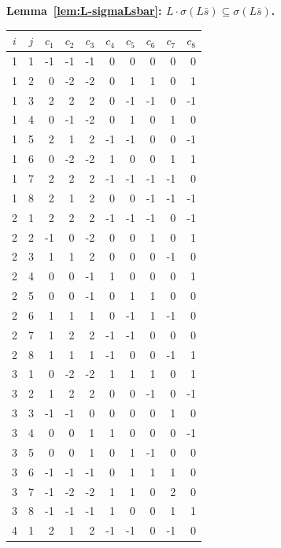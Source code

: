 \documentclass[twoside,english]{paper}
\numberwithin{equation}{section}
\numberwithin{figure}{section}
\theoremstyle{definition}
\theoremstyle{remark}
\begin{document}
\begin{table}[H]
\centering
{\bfseries Lemma~\ref{lem:L-sigmaLsbar}: $L \cdot \sigma(L\bar s) \subseteq \sigma(L\bar s)$.}\par\medskip
\footnotesize
\setlength{\tabcolsep}{4pt}
\begin{minipage}[t]{0.48\textwidth}
\centering
\begin{tabular}{cc|rrrrrrrr}
\toprule
$i$ & $j$ & $c_1$ & $c_2$ & $c_3$ & $c_4$ & $c_5$ & $c_6$ & $c_7$ & $c_8$ \\
\midrule
1 & 1 & -1 & -1 & -1 & 0 & 0 & 0 & 0 & 0 \\
1 & 2 & 0 & -2 & -2 & 0 & 1 & 1 & 0 & 1 \\
1 & 3 & 2 & 2 & 2 & 0 & -1 & -1 & 0 & -1 \\
1 & 4 & 0 & -1 & -2 & 0 & 1 & 0 & 1 & 0 \\
1 & 5 & 2 & 1 & 2 & -1 & -1 & 0 & 0 & -1 \\
1 & 6 & 0 & -2 & -2 & 1 & 0 & 0 & 1 & 1 \\
1 & 7 & 2 & 2 & 2 & -1 & -1 & -1 & -1 & 0 \\
1 & 8 & 2 & 1 & 2 & 0 & 0 & -1 & -1 & -1 \\
\midrule
2 & 1 & 2 & 2 & 2 & -1 & -1 & -1 & 0 & -1 \\
2 & 2 & -1 & 0 & -2 & 0 & 0 & 1 & 0 & 1 \\
2 & 3 & 1 & 1 & 2 & 0 & 0 & 0 & -1 & 0 \\
2 & 4 & 0 & 0 & -1 & 1 & 0 & 0 & 0 & 1 \\
2 & 5 & 0 & 0 & -1 & 0 & 1 & 1 & 0 & 0 \\
2 & 6 & 1 & 1 & 1 & 0 & -1 & 1 & -1 & 0 \\
2 & 7 & 1 & 2 & 2 & -1 & -1 & 0 & 0 & 0 \\
2 & 8 & 1 & 1 & 1 & -1 & 0 & 0 & -1 & 1 \\
\midrule
3 & 1 & 0 & -2 & -2 & 1 & 1 & 1 & 0 & 1 \\
3 & 2 & 1 & 2 & 2 & 0 & 0 & -1 & 0 & -1 \\
3 & 3 & -1 & -1 & 0 & 0 & 0 & 0 & 1 & 0 \\
3 & 4 & 0 & 0 & 1 & 1 & 0 & 0 & 0 & -1 \\
3 & 5 & 0 & 0 & 1 & 0 & 1 & -1 & 0 & 0 \\
3 & 6 & -1 & -1 & -1 & 0 & 1 & 1 & 1 & 0 \\
3 & 7 & -1 & -2 & -2 & 1 & 1 & 0 & 2 & 0 \\
3 & 8 & -1 & -1 & -1 & 1 & 0 & 0 & 1 & 1 \\
\midrule
4 & 1 & 2 & 1 & 2 & -1 & -1 & 0 & -1 & 0 \\

\end{tabular}
\end{minipage}
\end{table}
\end{document}

